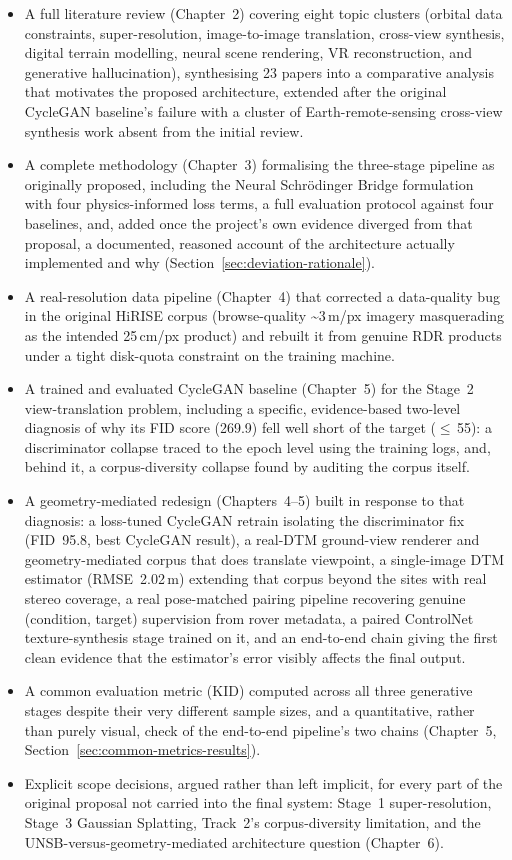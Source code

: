 \begin{itemize}
	\item A full literature review (Chapter~2) covering eight topic clusters (orbital data constraints, super-resolution, image-to-image translation, cross-view synthesis, digital terrain modelling, neural scene rendering, VR reconstruction, and generative hallucination), synthesising 23 papers into a comparative analysis that motivates the proposed architecture, extended after the original CycleGAN baseline's failure with a cluster of Earth-remote-sensing cross-view synthesis work absent from the initial review.
	\item A complete methodology (Chapter~3) formalising the three-stage pipeline as originally proposed, including the Neural Schr\"{o}dinger Bridge formulation with four physics-informed loss terms, a full evaluation protocol against four baselines, and, added once the project's own evidence diverged from that proposal, a documented, reasoned account of the architecture actually implemented and why (Section~\ref{sec:deviation-rationale}).
	\item A real-resolution data pipeline (Chapter~4) that corrected a data-quality bug in the original HiRISE corpus (browse-quality \textasciitilde3\,m/px imagery masquerading as the intended 25\,cm/px product) and rebuilt it from genuine RDR products under a tight disk-quota constraint on the training machine.
	\item A trained and evaluated CycleGAN baseline (Chapter~5) for the Stage~2 view-translation problem, including a specific, evidence-based two-level diagnosis of why its FID score (269.9) fell well short of the target ($\leq$\,55): a discriminator collapse traced to the epoch level using the training logs, and, behind it, a corpus-diversity collapse found by auditing the corpus itself.
	\item A geometry-mediated redesign (Chapters~4--5) built in response to that diagnosis: a loss-tuned CycleGAN retrain isolating the discriminator fix (FID~95.8, best CycleGAN result), a real-DTM ground-view renderer and geometry-mediated corpus that does translate viewpoint, a single-image DTM estimator (RMSE~2.02\,m) extending that corpus beyond the sites with real stereo coverage, a real pose-matched pairing pipeline recovering genuine (condition, target) supervision from rover metadata, a paired ControlNet texture-synthesis stage trained on it, and an end-to-end chain giving the first clean evidence that the estimator's error visibly affects the final output.
	\item A common evaluation metric (KID) computed across all three generative stages despite their very different sample sizes, and a quantitative, rather than purely visual, check of the end-to-end pipeline's two chains (Chapter~5, Section~\ref{sec:common-metrics-results}).
	\item Explicit scope decisions, argued rather than left implicit, for every part of the original proposal not carried into the final system: Stage~1 super-resolution, Stage~3 Gaussian Splatting, Track~2's corpus-diversity limitation, and the UNSB-versus-geometry-mediated architecture question (Chapter~6).
\end{itemize}

